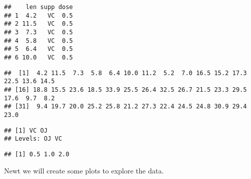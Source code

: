 \documentclass[
]{article}
\newenvironment{Shaded}{\begin{snugshade}}{\end{snugshade}}
\newcommand{\KeywordTok}[1]{\textcolor[rgb]{0.13,0.29,0.53}{\textbf{#1}}}
\newcommand{\NormalTok}[1]{#1}
\newcommand{\OperatorTok}[1]{\textcolor[rgb]{0.81,0.36,0.00}{\textbf{#1}}}
\begin{document}
\begin{verbatim}
##    len supp dose
## 1  4.2   VC  0.5
## 2 11.5   VC  0.5
## 3  7.3   VC  0.5
## 4  5.8   VC  0.5
## 5  6.4   VC  0.5
## 6 10.0   VC  0.5
\end{verbatim}

\begin{Shaded}
\end{Shaded}

\begin{verbatim}
##  [1]  4.2 11.5  7.3  5.8  6.4 10.0 11.2  5.2  7.0 16.5 15.2 17.3 22.5 13.6 14.5
## [16] 18.8 15.5 23.6 18.5 33.9 25.5 26.4 32.5 26.7 21.5 23.3 29.5 17.6  9.7  8.2
## [31]  9.4 19.7 20.0 25.2 25.8 21.2 27.3 22.4 24.5 24.8 30.9 29.4 23.0
\end{verbatim}

\begin{Shaded}
\end{Shaded}

\begin{verbatim}
## [1] VC OJ
## Levels: OJ VC
\end{verbatim}

\begin{Shaded}
\end{Shaded}

\begin{verbatim}
## [1] 0.5 1.0 2.0
\end{verbatim}

Newt we will create some plots to explore the data.
\end{document}
